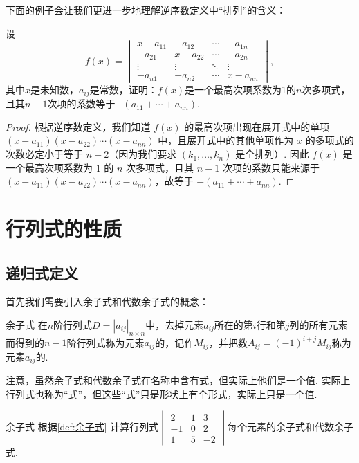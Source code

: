 下面的例子会让我们更进一步地理解逆序数定义中``排列''的含义：
\begin{example}{}{}
    设
    \[f(x)=\begin{vmatrix}
            x-a_{11} & -a_{12}  & \cdots & -a_{1n}  \\
            -a_{21}  & x-a_{22} & \cdots & -a_{2n}  \\
            \vdots   & \vdots   & \ddots & \vdots   \\
            -a_{n1}  & -a_{n2}  & \cdots & x-a_{nn}
        \end{vmatrix},\]
    其中$x$是未知数，$a_{ij}$是常数，证明：$f(x)$是一个最高次项系数为1的$n$次多项式，且其$n-1$次项的系数等于$-(a_{11}+\cdots+a_{nn})$.
\end{example}

\begin{proof}
    根据逆序数定义，我们知道 $f(x)$ 的最高次项出现在展开式中的单项 $(x-a_{11})(x-a_{22})\cdots(x-a_{nn})$ 中，且展开式中的其他单项作为 $x$ 的多项式的次数必定小于等于 $n-2$（因为我们要求 $(k_1,\ldots,k_n)$ 是全排列）. 因此 $f(x)$ 是一个最高次项系数为 $1$ 的 $n$ 次多项式，且其 $n-1$ 次项的系数只能来源于 $(x-a_{11})(x-a_{22})\cdots(x-a_{nn})$，故等于 $-(a_{11}+\cdots+a_{nn})$.
\end{proof}

\section{行列式的性质}
\subsection{递归式定义}

首先我们需要引入余子式和代数余子式的概念：
\begin{definition}{}{余子式}
    在$n$阶行列式$D=|a_{ij}|_{n \times n}$中，去掉元素$a_{ij}$所在的第$i$行和第$j$列的所有元素而得到的$n-1$阶行列式称为元素$a_{ij}$的，记作$M_{ij}$，并把数$A_{ij}=(-1)^{i+j}M_{ij}$称为元素$a_{ij}$的.
\end{definition}
注意，虽然余子式和代数余子式在名称中含有式，但实际上他们是一个值. 实际上行列式也称为``式''，但这些``式''只是形状上有个形式，实际上只是一个值.
\begin{example}{}{余子式}
    根据\autoref{def:余子式} 计算行列式$\begin{vmatrix}
            2  & 1 & 3  \\
            -1 & 0 & 2  \\
            1  & 5 & -2
        \end{vmatrix}$每个元素的余子式和代数余子式.
\end{example}

